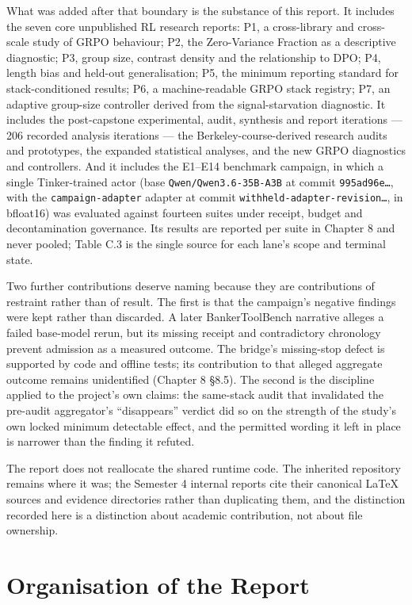 \documentclass[12pt,a4paper]{report}
\begin{document}
What was added after that boundary is the substance of this report. It
includes the seven core unpublished RL research reports: P1, a
cross-library and cross-scale study of GRPO behaviour; P2, the
Zero-Variance Fraction as a descriptive diagnostic; P3, group size,
contrast density and the relationship to DPO; P4, length bias and
held-out generalisation; P5, the minimum reporting standard for
stack-conditioned results; P6, a machine-readable GRPO stack registry;
P7, an adaptive group-size controller derived from the signal-starvation
diagnostic. It includes the post-capstone experimental, audit, synthesis
and report iterations --- 206 recorded analysis iterations --- the
Berkeley-course-derived research audits and prototypes, the expanded
statistical analyses, and the new GRPO diagnostics and controllers. And
it includes the E1--E14 benchmark campaign, in which a single
Tinker-trained actor (base \texttt{Qwen/Qwen3.6-35B-A3B} at commit
\texttt{995ad96e…}, with the \texttt{campaign-adapter} adapter at commit
\texttt{withheld-adapter-revision…}, in bfloat16) was evaluated against
fourteen suites under receipt, budget and decontamination governance.
Its results are reported per suite in Chapter 8 and never pooled; Table
C.3 is the single source for each lane's scope and terminal state.

Two further contributions deserve naming because they are contributions
of restraint rather than of result. The first is that the campaign's
negative findings were kept rather than discarded. A later
BankerToolBench narrative alleges a failed base-model rerun, but its
missing receipt and contradictory chronology prevent admission as a
measured outcome. The bridge's missing-stop defect is supported by code
and offline tests; its contribution to that alleged aggregate outcome
remains unidentified (Chapter 8 §8.5). The second is the discipline
applied to the project's own claims: the same-stack audit that
invalidated the pre-audit aggregator's ``disappears'' verdict did so on
the strength of the study's own locked minimum detectable effect, and
the permitted wording it left in place is narrower than the finding it
refuted.

The report does not reallocate the shared runtime code. The inherited
repository remains where it was; the Semester 4 internal reports cite
their canonical LaTeX sources and evidence directories rather than
duplicating them, and the distinction recorded here is a distinction
about academic contribution, not about file ownership.

\section{Organisation of the Report}\label{organisation-of-the-report}
\end{document}

